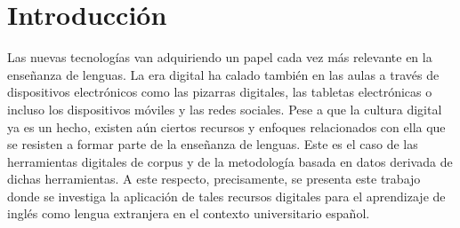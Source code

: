 \section{Introducción}\label{sec-introducción}

Las nuevas tecnologías van adquiriendo un papel cada vez más relevante
en la enseñanza de lenguas. La era digital ha calado también en las
aulas a través de dispositivos electrónicos como las pizarras
digitales, las tabletas electrónicas o incluso los dispositivos
móviles y las redes sociales. Pese a que la cultura digital ya es un
hecho, existen aún ciertos recursos y enfoques relacionados con ella
que se resisten a formar parte de la enseñanza de lenguas. Este es el
caso de las herramientas digitales de corpus y de la metodología
basada en datos derivada de dichas herramientas. A este respecto,
precisamente, se presenta este trabajo donde se investiga la
aplicación de tales recursos digitales para el aprendizaje de inglés
como lengua extranjera en el contexto universitario español.
